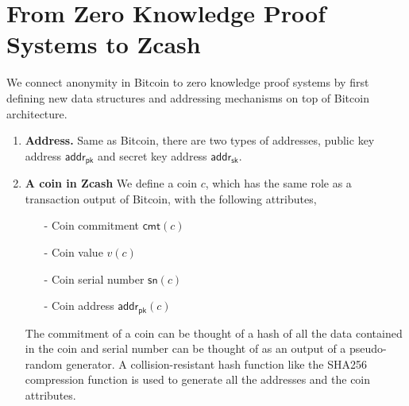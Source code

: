 \documentclass[a4paper]{article}
\newcommand{\cmt}{\textsf{cmt}}
\newcommand{\sn}{\textsf{sn}}
\newcommand{\adpk}{\textsf{addr}_{\textsf{pk}}}
\newcommand{\adsk}{\textsf{addr}_{\textsf{sk}}}
\begin{document}
\section*{From Zero Knowledge Proof Systems to Zcash}\label{sec:def}
We connect anonymity in Bitcoin to zero knowledge proof systems by first  defining new data structures and addressing mechanisms  on top of Bitcoin architecture.
\begin{enumerate}
    \item \textbf{Address.} Same as Bitcoin, there are two types of addresses, public key address $\adpk$ and secret key address $\adsk$. 
    \item \textbf{A coin in Zcash} We define a coin $c$, which has the same role as a transaction output of Bitcoin, with the following attributes,
    \begin{itemize}
        \item[-] Coin commitment $\cmt(c)$
        \item[-] Coin value $v(c)$
        \item[-] Coin serial number $\sn(c)$
        \item[-] Coin address $\adpk(c)$
    \end{itemize}
    The commitment of a coin can be thought of a hash of all the data contained in the coin and serial number can be thought of as an output of a pseudo-random generator. %
    A collision-resistant hash function like the SHA256 compression function is used to generate all the addresses and the coin attributes. 

\end{enumerate}
\end{document}
